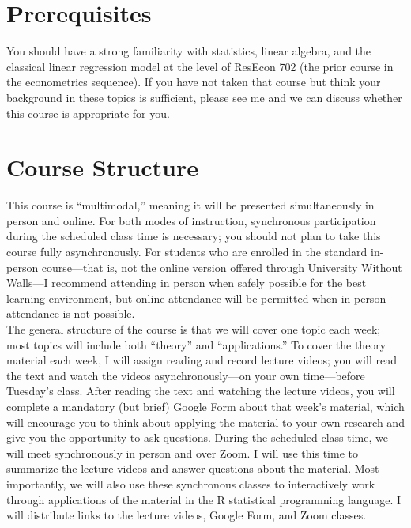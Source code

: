 \documentclass[11pt,letterpaper]{article}
\begin{document}
\section*{Prerequisites}

You should have a strong familiarity with statistics, linear algebra, and the classical linear regression model at the level of ResEcon 702 (the prior course in the econometrics sequence). If you have not taken that course but think your background in these topics is sufficient, please see me and we can discuss whether this course is appropriate for you.

\section*{Course Structure}

This course is ``multimodal,'' meaning it will be presented simultaneously in person and online. For both modes of instruction, synchronous participation during the scheduled class time is necessary; you should not plan to take this course fully asynchronously. For students who are enrolled in the standard in-person course---that is, not the online version offered through University Without Walls---I recommend attending in person when safely possible for the best learning environment, but online attendance will be permitted when in-person attendance is not possible. \\

\noindent The general structure of the course is that we will cover one topic each week; most topics will include both ``theory'' and ``applications.'' To cover the theory material each week, I will assign reading and record lecture videos; you will read the text and watch the videos asynchronously---on your own time---before Tuesday's class. After reading the text and watching the lecture videos, you will complete a mandatory (but brief) Google Form about that week's material, which will encourage you to think about applying the material to your own research and give you the opportunity to ask questions. During the scheduled class time, we will meet synchronously in person and over Zoom. I will use this time to summarize the lecture videos and answer questions about the material. Most importantly, we will also use these synchronous classes to interactively work through applications of the material in the R statistical programming language. I will distribute links to the lecture videos, Google Form, and Zoom classes. \\
\end{document}
